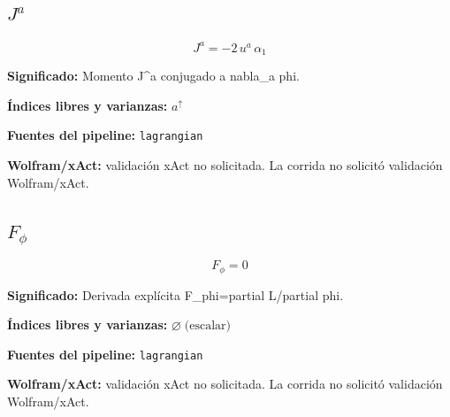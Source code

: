 \documentclass[11pt]{article}
\begin{document}
\subsection*{$ J^a $}
\begin{dmath*}[breakdepth={5}]
J^a = -2\,u{}^{a}\,\alpha_{1}
\end{dmath*}
\par\vspace{1.2\baselineskip}\noindent
\begin{minipage}{\linewidth}
\textbf{Significado:} Momento J^a conjugado a nabla\_a phi.\par
\textbf{Índices libres y varianzas:} $ a^{\uparrow} $\par
\textbf{Fuentes del pipeline:} \texttt{lagrangian}\par
\textbf{Wolfram/xAct:} validación xAct no solicitada. La corrida no solicitó validación Wolfram/xAct.\par
\end{minipage}
\subsection*{$ F_{\phi} $}
\begin{dmath*}[breakdepth={5}]
F_{\phi} = 0
\end{dmath*}
\par\vspace{1.2\baselineskip}\noindent
\begin{minipage}{\linewidth}
\textbf{Significado:} Derivada explícita F\_phi=partial L/partial phi.\par
\textbf{Índices libres y varianzas:} $ \varnothing\;\text{(escalar)} $\par
\textbf{Fuentes del pipeline:} \texttt{lagrangian}\par
\textbf{Wolfram/xAct:} validación xAct no solicitada. La corrida no solicitó validación Wolfram/xAct.\par
\end{minipage}
\end{document}

